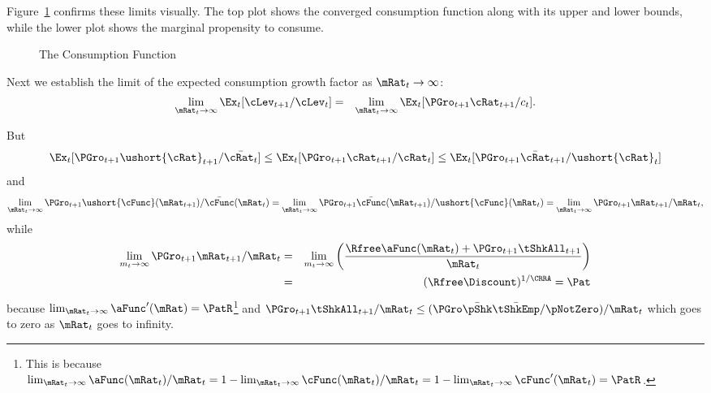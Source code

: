 \documentclass[titlepage]{\econtex}\providecommand{\texname}{BufferStockTheory}%
\providecommand{\FigDir}{Figures}
\renewcommand{\FigDir}{Code/Python/Figures}
\begin{document}
{Figure~\ref{fig:mpclimits} confirms these limits visually.  The top
plot shows the converged consumption function along with its upper and lower bounds,
while the lower plot shows the marginal propensity to consume.

\begin{figure}
\centering
{}
%
\begin{comment}
\medskip\medskip\medskip
\texttt{[image: \\FigDir/MPClimits]}
\caption{Bounds (in Dark) of $\cFunc(\mRat)$ and $\cFunc^{\prime}(\mRat)$ as $\mRat_{t} \rightarrow \infty$ and $\mRat_{t}\rightarrow 0$}
\end{comment}
\caption{The Consumption Function}
\label{fig:mpclimits}
\end{figure}
%

Next we establish the limit of the expected consumption growth factor
as $\mRat_{t} \rightarrow \infty$:
\begin{eqnarray}
\lim_{\mRat_{t} \rightarrow \infty} \Ex_{t}[
\cLev_{t+1}/\cLev_{t}] & = & \lim_{\mRat_{t} \rightarrow \infty} \Ex_{t}[
{\PGro}_{t+1} {\cRat}_{t+1}/c_{t}]. \notag
\end{eqnarray}

But
\begin{eqnarray*}
\Ex_{t}[{\PGro}_{t+1} {\ushort{\cRat}}_{t+1}/\bar{\cRat_{t}}] \leq \Ex_{t}[{\PGro}_{t+1} {\cRat}_{t+1}/\cRat_{t}] \leq \Ex_{t}[{\PGro}_{t+1} {\bar{\cRat}}_{t+1}/\ushort{\cRat}_{t}]
\end{eqnarray*}
and
\begin{equation}  \label{eq:xttoinfty}
\lim_{\mRat_t \rightarrow \infty} \PGro_{t+1}\ushort{\cFunc}(\mRat_{t+1})/\bar{\cFunc}(\mRat_t) =
\lim_{\mRat_{t} \rightarrow \infty} \PGro_{t+1}\bar{\cFunc}(\mRat_{t+1})/\ushort{\cFunc}(\mRat_t) =
\lim_{\mRat_{t} \rightarrow \infty}\PGro_{t+1} \mRat_{t+1}/\mRat_t,  \notag
\end{equation}
while
\begin{eqnarray*}  \label{eq:xtp1toinfty}
\lim_{m_{t} \rightarrow \infty} \PGro_{t+1} \mRat_{t+1}/\mRat_t & = & \lim_{m_{t} \rightarrow \infty}
\left(\frac{\Rfree \aFunc(\mRat_t)+{\PGro}_{t+1}\tShkAll_{t+1}}{\mRat_t}\right)
\\ & = & (\Rfree \Discount)^{1/\CRRA} = \Pat
\end{eqnarray*}
because $\lim_{\mRat_{t}\rightarrow \infty} \aFunc^{\prime}(\mRat)=\PatR$\footnote{This is because $\lim_{\mRat_{t}\rightarrow \infty} \aFunc(\mRat_{t})/\mRat_{t}=1-\lim_{\mRat_{t}\rightarrow \infty} \cFunc(\mRat_{t})/\mRat_{t}=1-\lim_{\mRat_{t}\rightarrow \infty}\cFunc^{\prime}(\mRat_{t})=\PatR$.} and
$\PGro_{t+1}\tShkAll_{t+1}/\mRat_{t} \leq (\PGro \bar{\pShk} \bar{\tShkEmp}/\pNotZero )/\mRat_{t}$ which
goes to zero as $\mRat_{t}$ goes to infinity.

}
\end{document}
